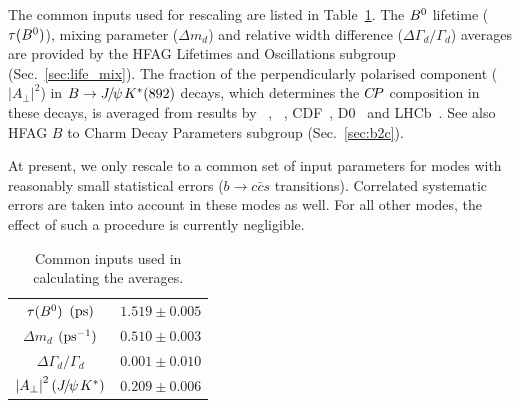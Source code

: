 \label{sec:cp_uta:common_inputs}

The common inputs used for rescaling are listed in 
Table~\ref{tab:cp_uta:common_inputs}.
The $B^0$ lifetime ($\tau(B^0)$), mixing parameter ($\Delta m_d$) and relative width difference ($\Delta\Gamma_d / \Gamma_d$)
averages are provided by the HFAG Lifetimes and Oscillations 
subgroup (Sec.~\ref{sec:life_mix}).
The fraction of the perpendicularly polarised component 
($\left| A_{\perp} \right|^2$) in $B \to {J\mskip -3mu/\mskip -2mu\psi\mskip 2mu} K^*(892)$ decays,
which determines the $C\!P$ composition in these decays, 
is averaged from results by 
\babar~\cite{Aubert:2007hz}, \belle~\cite{Itoh:2005ks}, CDF~\cite{Acosta:2004gt}, D0~\cite{Abazov:2008jz} and LHCb~\cite{Aaij:2013cma}.
See also HFAG $B$ to Charm Decay Parameters subgroup (Sec.~\ref{sec:b2c}).

At present, we only rescale to a common set of input parameters
for modes with reasonably small statistical errors
($b \to c\bar{c}s$ transitions).
Correlated systematic errors are taken into account
in these modes as well.
For all other modes, the effect of such a procedure is 
currently negligible.

\begin{table}[htbp]
  \begin{center}
    \caption{
      Common inputs used in calculating the averages.
    }
    \vspace{0.2cm}
    \setlength{\tabcolsep}{1.0pc}
    \begin{tabular}{cc} \hline 
      $\tau(B^0)$ $({\rm ps})$  & $1.519 \pm 0.005$  \\
      $\Delta m_d$ $({\rm ps}^{-1})$ & $0.510 \pm 0.003$ \\
      $\Delta\Gamma_d / \Gamma_d$ & $0.001 \pm 0.010$ \\
      $\left| A_{\perp} \right|^2 ({J\mskip -3mu/\mskip -2mu\psi\mskip 2mu} K^*)$ & $0.209 \pm 0.006$ \\
      \hline
    \end{tabular}
    \label{tab:cp_uta:common_inputs}
  \end{center}
\end{table}


